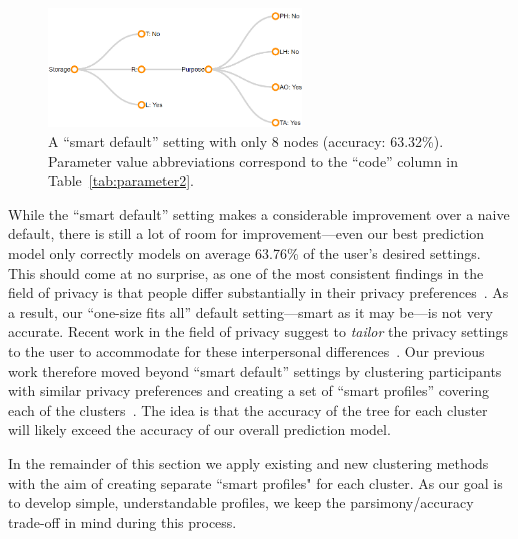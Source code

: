 \begin{figure}
	\centering
	\includegraphics[width=0.6\textwidth]{figures/smartdefault001.png}
	\caption{A ``smart default'' setting with only 8 nodes (accuracy: 63.32\%). Parameter value abbreviations correspond to the ``code'' column in Table~\ref{tab:parameter2}.}
	\label{fig:smart_default_new}
\end{figure}


While the ``smart default'' setting makes a considerable improvement over a naive default, there is still a lot of room for improvement---even our best prediction model only correctly models on average 63.76\% of the user's desired settings. This should come at no surprise, as one of the most consistent findings in the field of privacy is that people differ substantially in their privacy preferences~\cite{knijnenburg2013dimensionality}. As a result, our ``one-size fits all'' default setting---smart as it may be---is not very accurate. Recent work in the field of privacy suggest to \emph{tailor} the privacy settings to the user to accommodate for these interpersonal differences~\cite{knijnenburg2017}. Our previous work therefore moved beyond ``smart default'' settings by clustering participants with similar privacy preferences and creating a set of ``smart profiles'' covering each of the clusters~\cite{bahiratiui2018}. The idea is that the accuracy of the tree for each cluster will likely exceed the accuracy of our overall prediction model. 

In the remainder of this section we apply existing and new clustering methods with the aim of creating separate ``smart profiles" for each cluster. As our goal is to develop simple, understandable profiles, we keep the parsimony/accuracy trade-off in mind during this process.


